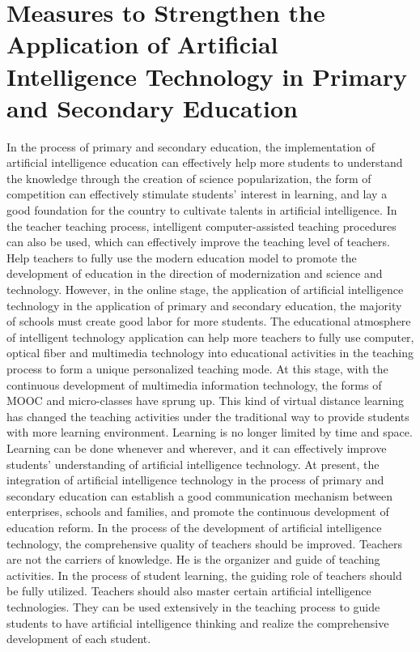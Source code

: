 \documentclass[lang=en,11pt,a4paper,towcolumn]{elegantpaper}
\begin{document}
{\section{Measures to Strengthen the Application of Artificial Intelligence Technology in Primary and Secondary Education}
In the process of primary and secondary education, the implementation of artificial intelligence education can effectively help more students to understand the knowledge through the creation of science popularization, the form of competition can effectively stimulate students' interest in learning, and lay a good foundation for the country to cultivate talents in artificial intelligence. In the teacher teaching process, intelligent computer-assisted teaching procedures can also be used, which can effectively improve the teaching level of teachers. Help teachers to fully use the modern education model to promote the development of education in the direction of modernization and science and technology. However, in the online stage, the application of artificial intelligence technology in the application of primary and secondary education, the majority of schools must create good labor for more students. The educational atmosphere of intelligent technology application can help more teachers to fully use computer, optical fiber and multimedia technology into educational activities in the teaching process to form a unique personalized teaching mode. At this stage, with the continuous development of multimedia information technology, the forms of MOOC and micro-classes have sprung up. This kind of virtual distance learning has changed the teaching activities under the traditional way to provide students with more learning environment. Learning is no longer limited by time and space. Learning can be done whenever and wherever, and it can effectively improve students' understanding of artificial intelligence technology.
At present, the integration of artificial intelligence technology in the process of primary and secondary education can establish a good communication mechanism between enterprises, schools and families, and promote the continuous development of education reform. In the process of the development of artificial intelligence technology, the comprehensive quality of teachers should be improved. Teachers are not the carriers of knowledge. He is the organizer and guide of teaching activities. In the process of student learning, the guiding role of teachers should be fully utilized. Teachers should also master certain artificial intelligence technologies. They can be used extensively in the teaching process to guide students to have artificial intelligence thinking and realize the comprehensive development of each student.
}
\end{document}
